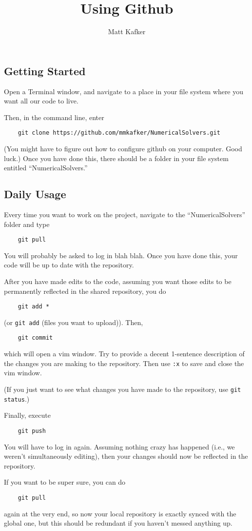 \documentclass[10pt]{article}
\title {Using Github}
\author{Matt Kafker}
\begin{document}
\maketitle

\subsection*{Getting Started}
Open a Terminal window, and navigate to a place in your file system where you want all our code to live.

Then, in the command line, enter


\begin{verbatim}
	git clone https://github.com/mmkafker/NumericalSolvers.git
\end{verbatim}

(You might have to figure out how to configure github on your computer. Good luck.) Once you have done this, there should be a folder in your file system entitled ``NumericalSolvers.''

\subsection*{Daily Usage}
Every time you want to work on the project, navigate to the ``NumericalSolvers'' folder and type 

\begin{verbatim}
	git pull
\end{verbatim}
You will probably be asked to log in blah blah. Once you have done this, your code will be up to date with the repository.    

After you have made edits to the code, assuming you want those edits to be permanently reflected in the shared repository, you do

\begin{verbatim}
	git add *
\end{verbatim}
(or \verb|git add| (files you want to upload)). Then,
\begin{verbatim}
	git commit
\end{verbatim}
which will open a vim window. Try to provide a decent 1-sentence description of the changes you are making to the repository. Then use \verb|:x| to save and close the vim window.

(If you just want to see what changes you have made to the repository, use \verb|git status|.)

Finally, execute
\begin{verbatim}
	git push
\end{verbatim}
You will have to log in again. Assuming nothing crazy has happened (i.e., we weren't simultaneously editing), then your changes should now be reflected in the repository.

If you want to be super sure, you can do 
\begin{verbatim}
	git pull
\end{verbatim}
again at the very end, so now your local repository is exactly synced with the global one, but this should be redundant if you haven't messed anything up.

    
    
\end{document}
